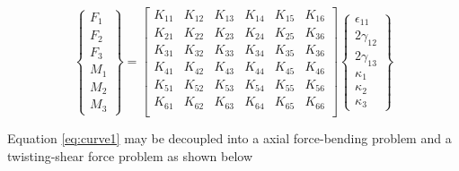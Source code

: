 \documentclass[letterpaper,12pt]{article}
\begin{document}
\begin{equation}
\label{eq:curve1}
\begin{Bmatrix}
F_1 \\  F_2 \\ F_3 \\ M_1 \\ M_2 \\ M_3
\end{Bmatrix}
 = 
\begin{bmatrix}
K_{11} & K_{12} & K_{13} & K_{14} & K_{15} & K_{16} \\
K_{21} & K_{22} & K_{23} & K_{24} & K_{25} & K_{36} \\
K_{31} & K_{32} & K_{33} & K_{34} & K_{35} & K_{36} \\
K_{41} & K_{42} & K_{43} & K_{44} & K_{45} & K_{46} \\
K_{51} & K_{52} & K_{53} & K_{54} & K_{55} & K_{56} \\
K_{61} & K_{62} & K_{63} & K_{64} & K_{65} & K_{66} \\
\end{bmatrix} \begin{Bmatrix}
\epsilon_{11} \\  2\gamma_{12} \\ 2\gamma_{13} \\ \kappa_1 \\ \kappa_2 \\ \kappa_3
\end{Bmatrix}
\end{equation}

 

Equation \ref{eq:curve1} may be decoupled into a axial force-bending problem and a twisting-shear force problem as shown below
\end{document}
